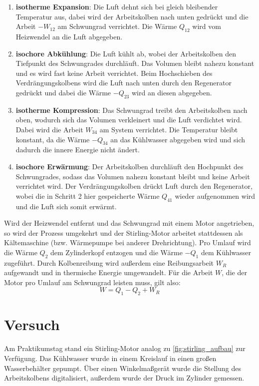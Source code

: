 \begin{enumerate}
	\item \textbf{isotherme Expansion}: Die Luft dehnt sich bei gleich bleibender Temperatur aus, dabei wird der Arbeitskolben nach unten gedrückt und die Arbeit $-W_{12}$ am Schwungrad verrichtet. Die Wärme $Q_{12}$ wird vom Heizwendel an die Luft abgegeben. 
	\item \textbf{isochore Abkühlung}: Die Luft kühlt ab, wobei der Arbeitskolben den Tiefpunkt des Schwungrades durchläuft. Das Volumen bleibt nahezu konstant und es wird fast keine Arbeit verrichtet. Beim Hochschieben des Verdrängungskolbens wird die Luft nach unten durch den Regenerator gedrückt und dabei die Wärme $-Q_{23}$ wird an diesen abgegeben.
	\item \textbf{isotherme Kompression}: Das Schwungrad treibt den Arbeitskolben nach oben, wodurch sich das Volumen verkleinert und die Luft verdichtet wird. Dabei wird die Arbeit $W_{34}$ am System verrichtet. Die Temperatur bleibt konstant, da die Wärme $-Q_{34}$ an das Kühlwasser abgegeben wird und sich dadurch die innere Energie nicht ändert.
	\item \textbf{isochore Erwärmung}: Der Arbeitskolben durchläuft den Hochpunkt des Schwungrades, sodass das Volumen nahezu konstant bleibt und keine Arbeit verrichtet wird. Der Verdrängungskolben drückt Luft durch den Regenerator, wobei die in Schritt 2 hier gespeicherte Wärme $Q_{41}$ wieder aufgenommen wird und die Luft sich somit erwärmt.
\end{enumerate}

Wird der Heizwendel entfernt und das Schwungrad mit einem Motor angetrieben, so wird der Prozess umgekehrt und der Stirling-Motor arbeitet stattdessen als Kältemaschine (bzw. Wärmepumpe bei anderer Drehrichtung). Pro Umlauf wird die Wärme $Q_2$ dem Zylinderkopf entzogen und die Wärme $-Q_1$ dem Kühlwasser zugeführt. Durch Kolbenreibung wird außerdem eine Reibungsarbeit $W_R$ aufgewandt und in thermische Energie umgewandelt. Für die Arbeit $W$, die der Motor pro Umlauf am Schwungrad leisten muss, gilt also:
\begin{equation}
	W=Q_1-Q_2+W_R
\label{eq:reibungsarbeit}
\end{equation}

\section{Versuch}
Am Praktikumstag stand ein Stirling-Motor analog zu \cref{fig:stirling_aufbau} zur Verfügung. Das Kühlwasser wurde in einem Kreislauf in einen großen Wasserbehälter gepumpt. Über einen Winkelmaßgerät wurde die Stellung des Arbeitskolbens digitalisiert, außerdem wurde der Druck im Zylinder gemessen.
